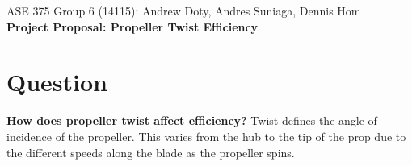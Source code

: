 \documentclass{article}
\begin{document}
\begin{flushleft}
    \small{ASE 375 Group 6 (14115): Andrew Doty, Andres Suniaga, Dennis Hom}\\[2mm]    
    \Large{\textbf{Project Proposal: Propeller Twist Efficiency}}\\[2mm]
\end{flushleft}
 
 
 
 
 
 
 
 

\section{Question}
\textbf{How does propeller twist affect efficiency?} Twist defines the angle of incidence of the propeller. This varies from the hub to the tip of the prop due to the different speeds along the blade as the propeller spins.
\end{document}
